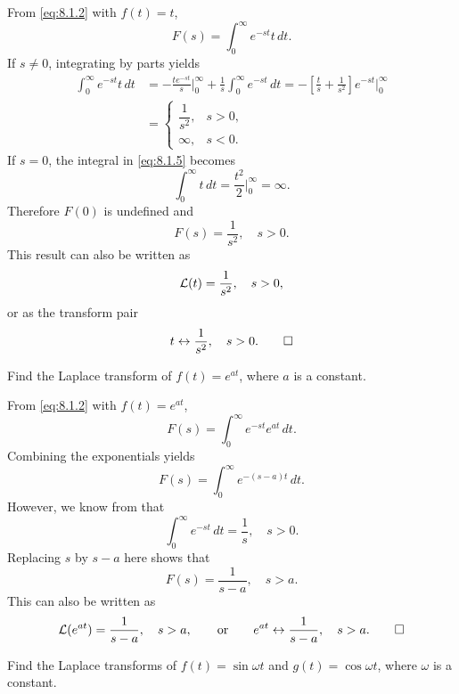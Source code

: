 \begin{solution}
  From  \eqref{eq:8.1.2} with $f(t)=t$,
\begin{equation}\label{eq:8.1.5}
F(s)=\int_0^\infty e^{-st}t\,dt.
\end{equation}
If $s\ne0$,  integrating by parts yields
\begin{align*}
\int_0^\infty e^{-st}t\,dt
&=-\frac{te^{-st}}{s}\bigg|_0^\infty+\frac{1}{s}\int_0^\infty e^{-st}\,dt
=-\left[\frac{t}{s}+\frac{1}{s^2}\right]e^{-st}\bigg|_0^\infty\\
&=\begin{cases}
\dfrac{1}{s^2},& s>0,\\
\infty,&s<0.
\end{cases}
\end{align*}
If $s=0$, the integral in  \eqref{eq:8.1.5} becomes
\[
\int_0^\infty t\,dt=\frac{t^2}{2}\bigg|_0^\infty=\infty.
\]
Therefore $F(0)$ is undefined and
\[
F(s)=\frac{1}{s^2},\quad s>0.
\]
This result can also be written as
\[
{\mathcal L}(t)=\frac{1}{s^2},\quad s>0,
\]
or as the transform pair
\[
t\leftrightarrow\frac{1}{s^2},\quad s>0.\qedhere
\]
\end{solution}

\begin{example}\label{example:8.1.3}
 Find the Laplace transform of $f(t)=e^{at}$, where $a$ is a constant.
\end{example}

\begin{solution}
From  \eqref{eq:8.1.2} with $f(t)=e^{at}$,
\[
F(s)=\int_0^\infty e^{-st}e^{at}\,dt.
\]
Combining the exponentials yields
\[
F(s)=\int_0^\infty e^{-(s-a)t}\,dt.
\]
However, we know from   that
\[
\int_0^\infty e^{-st}\,dt=\frac{1}{s},\quad s>0.
\]
Replacing $s$ by $s-a$ here shows that
\[
F(s)=\frac{1}{s-a},\quad s>a.
\]
This can also be written as
\[
{\mathcal L}(e^{at})=\frac{1}{s-a},\quad s>a, \qquad\text{or}\qquad
 e^{at}\leftrightarrow\frac{1}{s-a},\quad s>a.\qedhere
\]
\end{solution}

\begin{example}\label{example:8.1.4}
Find the Laplace transforms of $f(t)=\sin\omega t$ and
$g(t)=\cos\omega t$, where $\omega$ is a constant.
\end{example}

